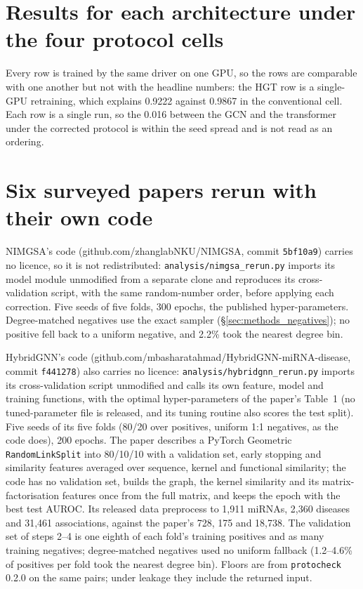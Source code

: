 \documentclass[review]{elsarticle}
\begin{document}
\appendix
\setcounter{table}{0}
\section{Results for each architecture under the four protocol cells}
\label{app:grid}
Every row is trained by the same driver on one GPU, so the rows are comparable with one another but not with
the headline numbers: the HGT row is a single-GPU retraining, which explains 0.9222 against 0.9867 in the
conventional cell. Each row is a single run, so the 0.016 between the GCN and the transformer under the
corrected protocol is within the seed spread and is not read as an ordering.



\section{Six surveyed papers rerun with their own code}
\label{app:nimgsa}
\setcounter{table}{0}
NIMGSA's code (github.com/zhanglabNKU/NIMGSA, commit \texttt{5bf10a9}) carries no licence, so it is not
redistributed: \texttt{analysis/nimgsa\_rerun.py} imports its model module unmodified from a separate clone
and reproduces its cross-validation script, with the same random-number order, before applying each
correction. Five seeds of five folds, 300 epochs, the published hyper-parameters. Degree-matched negatives
use the exact sampler (\S\ref{sec:methods_negatives}); no positive fell back to a uniform negative, and
2.2\% took the nearest degree bin.



HybridGNN's code (github.com/mbasharatahmad/HybridGNN-miRNA-disease, commit \texttt{f441278}) also carries
no licence: \texttt{analysis/hybridgnn\_rerun.py} imports its cross-validation script unmodified and calls its
own feature, model and training functions, with the optimal hyper-parameters of the paper's Table~1 (no
tuned-parameter file is released, and its tuning routine also scores the test split). Five seeds of its five
folds (80/20 over positives, uniform 1:1 negatives, as the code does), 200 epochs. The paper describes a
PyTorch Geometric \texttt{RandomLinkSplit} into 80/10/10 with a validation set, early stopping and similarity
features averaged over sequence, kernel and functional similarity; the code has no validation set, builds the
graph, the kernel similarity and its matrix-factorisation features once from the full matrix, and keeps the
epoch with the best test AUROC. Its released data preprocess to 1,911 miRNAs, 2,360 diseases and 31,461
associations, against the paper's 728, 175 and 18,738. The validation set of steps 2--4 is one eighth of each
fold's training positives and as many training negatives; degree-matched negatives used no uniform fallback
(1.2--4.6\% of positives per fold took the nearest degree bin). Floors are from \texttt{protocheck} 0.2.0 on the same
pairs; under leakage they include the returned input.
\end{document}
